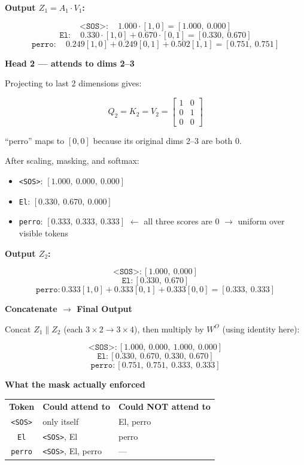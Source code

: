 \noindent\textbf{Output $Z_1 = A_1 \cdot V_1$:}

\[
\texttt{<SOS>}: \quad 1.000 \cdot [1,0] = [1.000,\ 0.000]
\]
\[
\texttt{El}: \quad 0.330 \cdot [1,0] + 0.670 \cdot [0,1] = [0.330,\ 0.670]
\]
\[
\texttt{perro}: \quad 0.249[1,0] + 0.249[0,1] + 0.502[1,1] = [0.751,\ 0.751]
\]

\medskip
\noindent\textbf{Head 2 --- attends to dims 2--3}

Projecting to last 2 dimensions gives:

\[
Q_2 = K_2 = V_2 = \begin{bmatrix}1 & 0\\0 & 1\\0 & 0\end{bmatrix}
\]

``perro'' maps to $[0, 0]$ because its original dims 2--3 are both 0.

After scaling, masking, and softmax:

\begin{itemize}
\item \texttt{<SOS>}: $[1.000,\ 0.000,\ 0.000]$
\item \texttt{El}: $[0.330,\ 0.670,\ 0.000]$
\item \texttt{perro}: $[0.333,\ 0.333,\ 0.333]$ $\leftarrow$ all three scores are 0 $\to$ uniform over visible tokens
\end{itemize}

\noindent\textbf{Output $Z_2$:}

\[
\texttt{<SOS>}: [1.000,\ 0.000]
\]
\[
\texttt{El}: [0.330,\ 0.670]
\]
\[
\texttt{perro}: 0.333[1,0]+0.333[0,1]+0.333[0,0] = [0.333,\ 0.333]
\]

\medskip
\noindent\textbf{Concatenate $\to$ Final Output}

Concat $Z_1 \| Z_2$ (each $3\times2 \to 3\times4$), then multiply by $W^O$ (using identity here):

\[
\texttt{<SOS>}: [1.000,\ 0.000,\ 1.000,\ 0.000]
\]
\[
\texttt{El}: [0.330,\ 0.670,\ 0.330,\ 0.670]
\]
\[
\texttt{perro}: [0.751,\ 0.751,\ 0.333,\ 0.333]
\]

\medskip
\noindent\textbf{What the mask actually enforced}

\begin{center}
\begin{tabular}{c|l|l}
\textbf{Token} & \textbf{Could attend to} & \textbf{Could NOT attend to} \\
\texttt{<SOS>} & only itself & El, perro \\
\texttt{El} & \texttt{<SOS>}, El & perro \\
\texttt{perro} & \texttt{<SOS>}, El, perro & --- \\
\end{tabular}
\end{center}

